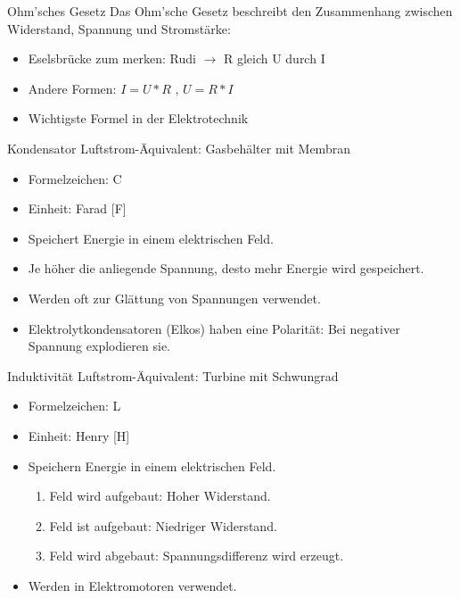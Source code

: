 \documentclass[12pt]{beamer}
\begin{document}
\begin{frame}{Ohm'sches Gesetz}
Das Ohm’sche Gesetz beschreibt den Zusammenhang zwischen Widerstand, Spannung und Stromstärke:
\begin{itemize}
\item Eselsbrücke zum merken: Rudi $\rightarrow$  R gleich U durch I
\item Andere Formen: $I = U * R$ , $U = R * I$
\item Wichtigste Formel in der Elektrotechnik
\end{itemize}
\end{frame}

\begin{frame}{Kondensator}
Luftstrom-Äquivalent: Gasbehälter mit Membran
\begin{itemize}
\item Formelzeichen: C
\item Einheit: Farad [F]
\item Speichert Energie in einem elektrischen Feld.
\item Je höher die anliegende Spannung, desto mehr Energie wird gespeichert.
\item Werden oft zur Glättung von Spannungen verwendet.
\item Elektrolytkondensatoren (Elkos) haben eine Polarität: Bei negativer Spannung explodieren sie.
\end{itemize}
\end{frame}

\begin{frame}{Induktivität}
Luftstrom-Äquivalent: Turbine mit Schwungrad
\begin{itemize}
\item Formelzeichen: L
\item Einheit: Henry [H]
\item Speichern Energie in einem elektrischen Feld.
\begin{enumerate}
\item Feld wird aufgebaut: Hoher Widerstand.
\item Feld ist aufgebaut: Niedriger Widerstand.
\item Feld wird abgebaut: Spannungsdifferenz wird erzeugt.
\end{enumerate}
\item Werden in Elektromotoren verwendet.
\end{itemize}
\end{frame}
\end{document}
